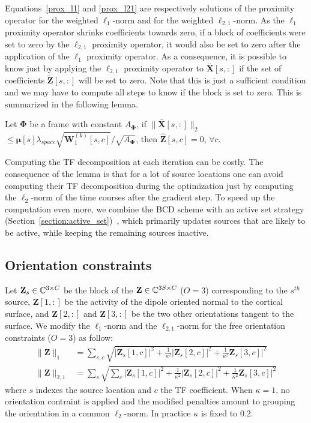 Equations~\eqref{prox_l1} and \eqref{prox_l21} are respectively solutions of the proximity operator for the weighted $\ell_1$-norm and for the weighted $\ell_{2,1}$-norm. As the $\ell_1$ proximity operator shrinks coefficients towards zero, if a block of coefficients were set to zero by the $\ell_{2,1}$ proximity operator, it would also be set to zero after the application of the $\ell_1$ proximity operator. As a consequence, it is possible to know just by applying the $\ell_{2,1}$ proximity operator to $\bar{\mathbf{X}}[s,:]$ if the set of coefficients $\tilde{\mathbf{Z}}[s,:]$ will be set to zero. Note that this is just a sufficient condition and we may have to compute all steps to know if the block is set to zero. This is summarized in the following lemma.

\begin{lemma}
    Let $\mathbf{\Phi}$ be a frame with constant $A_{\mathbf{\Phi}}$, if $\|\bar{\mathbf{X}}[s,:]\|_2$ $\leq \mathbf{\mu}[s]\lambda_{space}\sqrt{\mathbf{W}_1^{(k)}[s,c]} / \sqrt{A_{\mathbf{\Phi}}}$, then $\hat{\mathbf{Z}}[s,c] = 0$, $\forall c$.
\end{lemma}

Computing the TF decomposition at each iteration can be costly. The consequence of the lemma is that for a lot of source locations one can avoid computing their TF decomposition during the optimization just by computing the $\ell_{2}$-norm of the time courses after the gradient step.
To speed up the computation even more, we combine the BCD scheme with an active set strategy (Section~\ref{section:active_set})~\cite{friedman2010regularization}, which primarily updates sources that are likely to be active, while keeping the remaining sources inactive.

\subsection*{Orientation constraints}
Let $\mathbf{Z}_s\in\mathbb{C}^{3\times C}$ be the block of the $\mathbf{Z}\in\mathbb{C}^{3S\times C}$	($O=3$) corresponding to the $s^{th}$ source, $\mathbf{Z}[1,:]$ be the activity of the dipole oriented normal to the cortical surface, and $\mathbf{Z}[2,:]$ and $\mathbf{Z}[3,:]$ be the two other orientations tangent to the surface. We modify the $\ell_1$-norm and the $\ell_{2,1}$-norm for the free orientation constraints ($O=3$) as follow:
\begin{align*}
\|\mathbf{Z}\|_1 &= \sum_{s,c}\sqrt{|\mathbf{Z}_s[1,c]|^2 + \frac{1}{\kappa^2}|\mathbf{Z}_s[2,c]|^2 + \frac{1}{\kappa^2}\mathbf{Z}_s[3,c]|^2} \\
\|\mathbf{Z}\|_{2,1} &= \sum_s\sqrt{\sum_c |\mathbf{Z}_s[1,c]|^2 + \frac{1}{\kappa^2}|\mathbf{Z}_s[2,c]|^2 + \frac{1}{\kappa^2}\mathbf{Z}_s[3,c]|^2}
\end{align*}
where $s$ indexes the source location and $c$ the TF coefficient. When $\kappa=1$, no orientation contraint is applied and the modified penalties amount to grouping the orientation in a common $\ell_2$-norm. In practice $\kappa$ is fixed to $0.2$.

